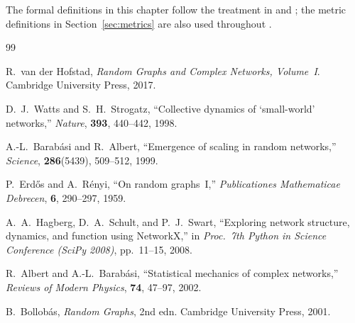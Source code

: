 \documentclass[12pt, a4paper]{report}
\theoremstyle{definition}
\theoremstyle{plain}
\theoremstyle{remark}
\begin{document}
The formal definitions in this chapter follow the treatment
in \cite{hofstad2017} and \cite{bollobas2001}; the metric
definitions in Section~\ref{sec:metrics} are also used
throughout \cite{albert2002}.

\begin{thebibliography}{99}

  R.~van der Hofstad,
  \textit{Random Graphs and Complex Networks, Volume~I}.
  Cambridge University Press, 2017.

  D.~J.~Watts and S.~H.~Strogatz,
  ``Collective dynamics of `small-world' networks,''
  \textit{Nature}, \textbf{393}, 440--442, 1998.

  A.-L.~Barab\'{a}si and R.~Albert,
  ``Emergence of scaling in random networks,''
  \textit{Science}, \textbf{286}(5439), 509--512, 1999.

  P.~Erd\H{o}s and A.~R\'{e}nyi,
  ``On random graphs~I,''
  \textit{Publicationes Mathematicae Debrecen}, \textbf{6},
  290--297, 1959.

  A.~A.~Hagberg, D.~A.~Schult, and P.~J.~Swart,
  ``Exploring network structure, dynamics, and function using
  NetworkX,''
  in \textit{Proc.\ 7th Python in Science Conference (SciPy 2008)},
  pp.~11--15, 2008.

  R.~Albert and A.-L.~Barab\'{a}si,
  ``Statistical mechanics of complex networks,''
  \textit{Reviews of Modern Physics}, \textbf{74}, 47--97, 2002.

  B.~Bollob\'{a}s,
  \textit{Random Graphs}, 2nd edn.
  Cambridge University Press, 2001.

\end{thebibliography}
\end{document}
